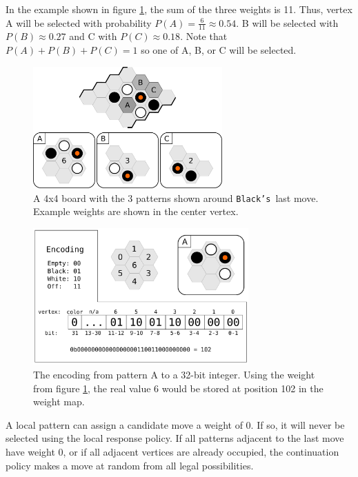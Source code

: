 \documentclass{acm_proc_article-sp}
\newcommand{\hblacks}{\texttt{Black's}}
\begin{document}
In the example shown in figure \ref{fig:localpattern}, the sum of the three weights is 11. Thus, vertex A will be selected with probability $P(A) = \frac{6}{11} \approx 0.54$. 
B will be selected with $P(B) \approx 0.27$ and C with $P(C) \approx 0.18$. 
Note that $P(A)+P(B)+P(C) = 1$ so one of A, B, or C will be selected. 

\begin{figure}
	\begin{center}
	\includegraphics[width=2.85in]{graphics/local-pattern.pdf}
	\caption{A 4x4 board with the 3 patterns shown around \hblacks\ last move. Example weights are shown in the center vertex.}
	\label{fig:localpattern}
	\end{center}
\end{figure}

\begin{figure}
	\begin{center}
	\includegraphics[width=3.25in]{graphics/weight-pattern-map.pdf}
	\caption{The encoding from pattern A to a 32-bit integer. Using the weight from figure \ref{fig:localpattern}, the real value 6 would be stored at position 102 in the weight map.}
	\label{fig:encoding}
	\end{center}
\end{figure}

A local pattern can assign a candidate move a weight of 0. If so, it will never be selected using the local response policy. 
If all patterns adjacent to the last move have weight 0, or if all adjacent vertices are already occupied, 
the continuation policy makes a move at random from all legal possibilities.
\end{document}
